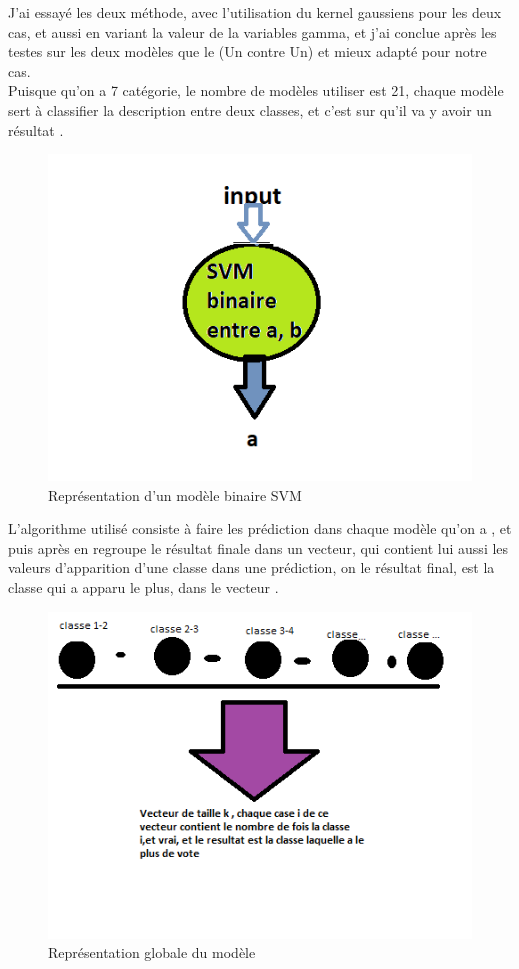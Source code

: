 J'ai essayé les deux méthode, avec l'utilisation du kernel gaussiens pour les deux cas, et aussi en variant la valeur de la variables gamma, et j'ai conclue après les testes sur les deux modèles que le (Un contre Un) et mieux adapté pour notre cas.\\
Puisque qu'on a 7 catégorie, le nombre de modèles utiliser est 21, chaque modèle sert à classifier la description entre deux classes, et c'est sur qu'il va y avoir un résultat .
\begin{figure}[H]
	\begin{center}
	\includegraphics[scale=0.7]{Images/svm_binaire.png}
	\end{center}
	\caption{Représentation d'un modèle binaire SVM}
	\label{fig:svm0}
\end{figure}
L'algorithme utilisé consiste à faire les prédiction dans chaque modèle qu'on a , et puis après en regroupe le résultat finale dans un vecteur, qui contient lui aussi les valeurs d'apparition d'une classe dans une prédiction, on le résultat final, est la classe qui a apparu le plus, dans le vecteur .
\begin{figure}[H]
	\begin{center}
	\includegraphics[scale=0.7]{Images/svm_rep.png}
	\end{center}
	\caption{Représentation globale du modèle}
	\label{fig:svm0}
\end{figure}



